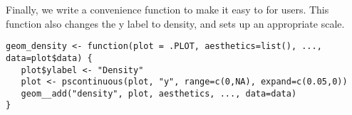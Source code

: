 Finally, we write a convenience function to make it easy to for users.  This function also changes the y label to density, and sets up an appropriate scale.

\begin{verbatim}
geom_density <- function(plot = .PLOT, aesthetics=list(), ..., data=plot$data) {
   plot$ylabel <- "Density"
   plot <- pscontinuous(plot, "y", range=c(0,NA), expand=c(0.05,0))
   geom__add("density", plot, aesthetics, ..., data=data)
}  
\end{verbatim}


